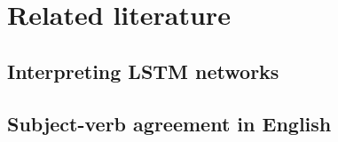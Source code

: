 
\section{Related literature}
\lipsum[1]

\subsection{Interpreting LSTM networks}
\lipsum[1]

\subsection{Subject-verb agreement in English}
\label{sect:pdf}
\lipsum[1]
